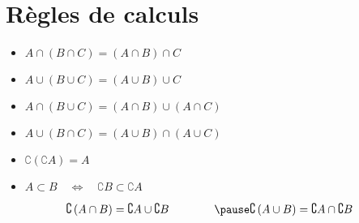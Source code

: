 \section{Règles de calculs}

\begin{frame}

\begin{itemize}
  \item $A \cap (B \cap C) = (A \cap B) \cap C$ 
\pause 
  \item $A \cup (B \cup C) = (A \cup B) \cup C$  
\end{itemize}

\pause
\medskip

\begin{itemize}
  \item $A \cap (B \cup C) = (A \cap B) \cup (A \cap C)$
\pause
  \item $A \cup (B \cap C) = (A \cup B) \cap (A \cup C)$
\end{itemize}

\pause
\medskip

\begin{itemize}
  \item $\complement \left( \complement A \right) = A$
\pause
  \item $A \subset B \quad \Longleftrightarrow \quad \complement B \subset \complement A$
\end{itemize}

\end{frame}


\begin{frame}

$$\complement \left( A \cap B \right) = \complement A \cup \complement B 
\qquad \qquad
\pause 
\complement \left( A \cup B \right) = \complement A \cap \complement B$$

\pause
\vspace*{-6mm}

\pause
{}

\end{frame}


